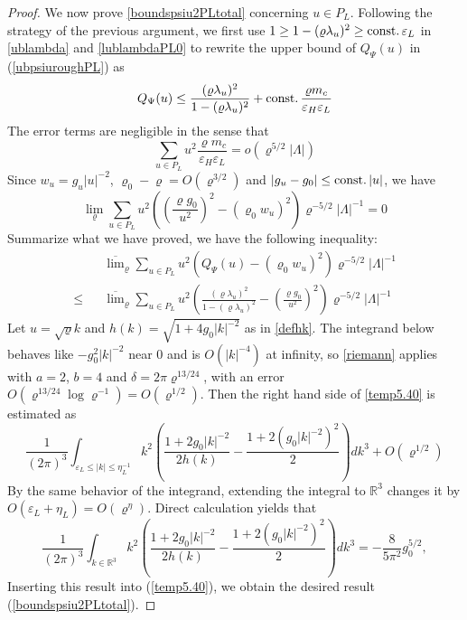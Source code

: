 \documentclass[11pt]{article}
\numberwithin{equation}{section}
\newcommand{\e}{\varepsilon}
\newcommand{\beq}{\begin{equation}}
\newcommand{\eeq}{\end{equation}}
\newcommand{\beqa}{\begin{eqnarray}}
\newcommand{\eeqa}{\end{eqnarray}}
\newcommand\R{{\mathbb R}}
\newcommand\eps{\varepsilon}
\newcommand\const{{\rm const.\, }}
\renewcommand\rho\varrho
\theoremstyle{definition}
\begin{document}
\begin{proof}
\par We now prove  \eqref{boundspsiu2PLtotal} concerning $ u\in P_L$.
Following the strategy of the previous argument, we first  use $1\ge 1-(\rho\lambda_u)^2 \ge \const \e_{L}$
in \eqref{ublambda} and \eqref{lublambdaPL0} to
rewrite  the upper bound of $ Q_\Psi(u)$ in (\ref{ubpsiuroughPL}) as
\beq
 Q_\Psi(u)%
\leq \frac{(\rho\lambda_u)^2}{1-(\rho\lambda_u)^2}+\const\frac{\rho m_c}{\eps_H\e_L}
\eeq
The error terms are negligible in the sense that 
\[
\sum_{u\in P_L}u^2\frac{\rho m_c}{\eps_H\e_L}=o(\rho^{5/2}|\Lambda|)
\]
Since  $w_u=g_u |u|^{-2}$, $\rho_0-\rho=O(\rho^{3/2})$ and $|g_u-g_0|\leq \const |u|$,   we have
\beq
\lim_{\rho}\sum_{u\in P_L}u^2\left( (\frac{\rho g_0}{u^2} )^2-(\rho_0w_u)^2\right)\rho^{-5/2}|\Lambda|^{-1}=0
\eeq
Summarize what we have proved, we have the following  inequality:
\beqa\label{temp5.40}
&&\overline\lim_{\rho}\sum_{u\in P_L}u^2\left( Q_\Psi(u)-(\rho_0w_u)^2\right)\rho^{-5/2}|\Lambda|^{-1}\\\nonumber
\leq &&\overline\lim_{\rho}\sum_{u\in P_L}u^2\left(\frac{(\rho\lambda_u)^2}{1-(\rho\lambda_u)^2}-(\frac{\rho g_0}{u^2} )^2\right)\rho^{-5/2}|\Lambda|^{-1}
\eeqa
Let $u=\sqrt{\rho}k$ and $h(k)=\sqrt{1+4g_0|k|^{-2}}$ as in \eqref{defhk}. The integrand below behaves like $-g_0^2|k|^{-2}$ near $0$ and is $O(|k|^{-4})$ at infinity, so \eqref{riemann} applies with $a=2$, $b=4$ and $\delta=2\pi\rho^{13/24}$, with an error $O(\rho^{13/24}\log\rho^{-1})=O(\rho^{1/2})$. Then the right hand side  of \eqref{temp5.40} is estimated as
\beq\nonumber
 \frac{1}{(2\pi)^3}\int_{\eps_L\leq |k|\leq\eta_L^{-1}}k^2\left(\frac{1+2g_0|k|^{-2}}{2h(k)}-\frac{1+2(g_0|k|^{-2})^2}2\right)dk^3+O(\rho^{1/2})
\eeq
By the same behavior of the integrand, extending the integral to $\R^3$ changes it by $O(\eps_L+\eta_L)=O(\rho^\eta)$. Direct calculation yields that
\beq
\frac{1}{(2\pi)^3}\int_{k\in \R^3}k^2\left(\frac{1+2g_0|k|^{-2}}{2h(k)}-\frac{1+2(g_0|k|^{-2})^2}2\right)dk^3=-\frac{8}{5\pi^2}g^{5/2}_0,
\eeq
Inserting this result into (\ref{temp5.40}), 
we obtain  the desired result (\ref{boundspsiu2PLtotal}).


\end{proof}
\end{document}
